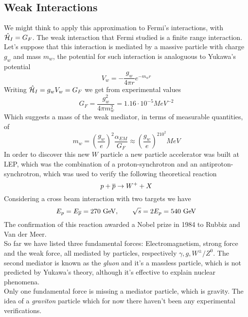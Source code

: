 \documentclass[../qm.tex]{subfiles}
\begin{document}
\subsection{Weak Interactions}
We might think to apply this approximation to Fermi's interactions, with $\hat{\mathcal{H}}_I=G_F$. The weak interaction that Fermi studied is a finite range interaction. Let's suppose that this interaction is mediated by a massive particle with charge $g_w$ and mass $m_w$, the potential for such interaction is analoguous to Yukawa's potential
\begin{equation}
	V_w=-\frac{g_w}{4\pi r}e^{-m_wr}
	\label{eq:weakpot}
\end{equation}
Writing $\hat{\mathcal{H}}_I=g_wV_w=G_F$ we get from experimental values
\begin{equation}
	G_F=\frac{g^2_w}{4\pi m_w^2}=1.16\cdot10^{-5}\unit{MeV^{-2}}
	\label{eq:fermicoupling}
\end{equation}
Which suggests a mass of the weak mediator, in terms of measurable quantities, of
\begin{equation}
	m_w=\left( \frac{g_w}{e} \right)^2\frac{\alpha_{EM}}{G_F}\approx\left( \frac{g_w}{e} \right)^210^2\unit{MeV}
	\label{eq:weakmediator}
\end{equation}
In order to discover this new $W$ particle a new particle accelerator was built at LEP, which was the combination of a proton-synchrotron and an antiproton-synchrotron, which was used to verify the following theoretical reaction
\begin{equation}
	p+\overline{p}\to W^++X
	\label{eq:protonsynchrotronweak}
\end{equation}
Considering a cross beam interaction with two targets we have
\begin{equation*}
	E_p=E_{\overline{p}}=270\ \mathrm{GeV},\qquad\sqrt{s}=2E_p=540\ \mathrm{GeV}
\end{equation*}
The confirmation of this reaction awarded a Nobel prize in 1984 to Rubbiz and Van der Meer.\\
So far we have listed three fundamental forces: Electromagnetism, strong force and the weak force, all mediated by particles, respectively $\gamma,g,W^{\pm}/Z^0$. The second mediator is known as the \emph{gluon} and it's a massless particle, which is not predicted by Yukawa's theory, although it's effective to explain nuclear phenomena.\\
Only one fundamental force is missing a mediator particle, which is gravity. The idea of a \emph{graviton} particle which for now there haven't been any experimental verifications.
\end{document}
